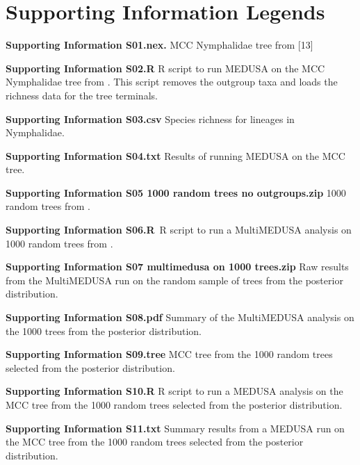 \documentclass[10pt]{article}
\begin{document}
\section*{Supporting Information Legends}
\begin{description}
 \item {\bf Supporting Information S01.nex.} MCC Nymphalidae tree from
{[}13{]}
 
 \item {\bf Supporting Information S02.R} R script to run MEDUSA on the
MCC Nymphalidae tree from \cite{wahlberg2009}. This script removes the outgroup
taxa and loads the richness data for the tree terminals.

 \item {\bf Supporting Information S03.csv} Species richness for lineages
in Nymphalidae.

 \item {\bf Supporting Information S04.txt} Results of running MEDUSA on
the MCC tree.

 \item {\bf Supporting Information S05 1000 random trees no outgroups.zip} 1000 random trees from \cite{wahlberg2009}.
 
 \item {\bf Supporting Information S06.R} R script to run a MultiMEDUSA
analysis on 1000 random trees from \cite{wahlberg2009}.

 \item {\bf Supporting Information S07 multimedusa on 1000 trees.zip} Raw results from the MultiMEDUSA run on the random sample of trees from
the posterior distribution.

 \item {\bf Supporting Information S08.pdf} Summary of the MultiMEDUSA
analysis on the 1000 trees from the posterior distribution.

 \item {\bf Supporting Information S09.tree} MCC tree from the 1000
random trees selected from the posterior distribution.

 \item {\bf Supporting Information S10.R} R script to run a MEDUSA
analysis on the MCC tree from the 1000 random trees selected from the
posterior distribution.

 \item {\bf Supporting Information S11.txt} Summary results from a MEDUSA
run on the MCC tree from the 1000 random trees selected from the
posterior distribution.


\end{description}
\end{document}
